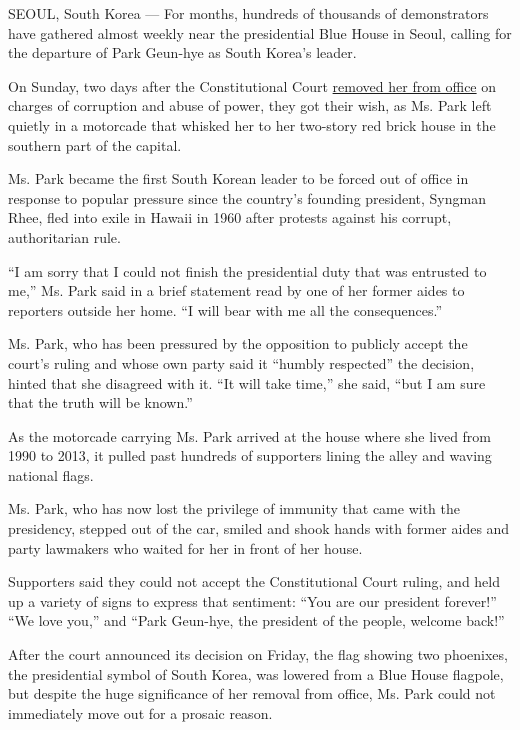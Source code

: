 SEOUL, South Korea --- For months, hundreds of thousands of
demonstrators have gathered almost weekly near the presidential Blue
House in Seoul, calling for the departure of Park Geun-hye as South
Korea's leader.

On Sunday, two days after the Constitutional Court
\href{https://www.nytimes3xbfgragh.onion/2017/03/09/world/asia/park-geun-hye-impeached-south-korea.html}{removed
her from office} on charges of corruption and abuse of power, they got
their wish, as Ms. Park left quietly in a motorcade that whisked her to
her two-story red brick house in the southern part of the capital.

Ms. Park became the first South Korean leader to be forced out of office
in response to popular pressure since the country's founding president,
Syngman Rhee, fled into exile in Hawaii in 1960 after protests against
his corrupt, authoritarian rule.

``I am sorry that I could not finish the presidential duty that was
entrusted to me,'' Ms. Park said in a brief statement read by one of her
former aides to reporters outside her home. ``I will bear with me all
the consequences.''

Ms. Park, who has been pressured by the opposition to publicly accept
the court's ruling and whose own party said it ``humbly respected'' the
decision, hinted that she disagreed with it. ``It will take time,'' she
said, ``but I am sure that the truth will be known.''

As the motorcade carrying Ms. Park arrived at the house where she lived
from 1990 to 2013, it pulled past hundreds of supporters lining the
alley and waving national flags.

Ms. Park, who has now lost the privilege of immunity that came with the
presidency, stepped out of the car, smiled and shook hands with former
aides and party lawmakers who waited for her in front of her house.

Supporters said they could not accept the Constitutional Court ruling,
and held up a variety of signs to express that sentiment: ``You are our
president forever!'' ``We love you,'' and ``Park Geun-hye, the president
of the people, welcome back!''

After the court announced its decision on Friday, the flag showing two
phoenixes, the presidential symbol of South Korea, was lowered from a
Blue House flagpole, but despite the huge significance of her removal
from office, Ms. Park could not immediately move out for a prosaic
reason.

